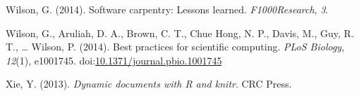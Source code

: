 \documentclass[american,man]{apa6}
\begin{document}
Wilson, G. (2014). Software carpentry: Lessons learned.
\emph{F1000Research}, \emph{3}.

Wilson, G., Aruliah, D. A., Brown, C. T., Chue Hong, N. P., Davis, M.,
Guy, R. T., \ldots{} Wilson, P. (2014). Best practices for scientific
computing. \emph{PLoS Biology}, \emph{12}(1), e1001745.
doi:\href{http://dx.doi.org/10.1371/journal.pbio.1001745}{10.1371/journal.pbio.1001745}

Xie, Y. (2013). \emph{Dynamic documents with R and knitr}. CRC Press.
\end{document}
